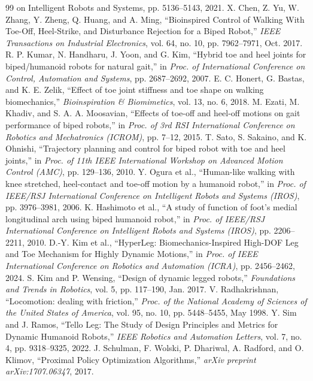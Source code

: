 \documentclass[10pt,twocolumn]{ICCAS}
\begin{document}
\begin{thebibliography}{99}
{on Intelligent Robots and Systems}, pp. 5136--5143, 2021.
X. Chen, Z. Yu, W. Zhang, Y. Zheng, Q. Huang, and A. Ming, ``Bioinspired Control of Walking With Toe-Off, Heel-Strike, and Disturbance Rejection for a Biped Robot,'' \textit{IEEE Transactions on
Industrial Electronics}, vol. 64, no. 10, pp. 7962--7971, Oct. 2017.
R. P. Kumar, N. Handharu, J. Yoon, and G. Kim, ``Hybrid toe and heel joints for biped/humanoid robots for natural gait,'' in \textit{Proc. of International Conference on Control, Automation and Systems},
pp. 2687--2692, 2007.
E. C. Honert, G. Bastas, and K. E. Zelik, ``Effect of toe joint stiffness and toe shape on walking biomechanics,'' \textit{Bioinspiration \& Biomimetics}, vol. 13, no. 6, 2018.
M. Ezati, M. Khadiv, and S. A. A. Moosavian, ``Effects of toe-off and heel-off motions on gait performance of biped robots,'' in \textit{Proc. of 3rd RSI International Conference on Robotics and
Mechatronics (ICROM)}, pp. 7--12, 2015.
T. Sato, S. Sakaino, and K. Ohnishi, ``Trajectory planning and control for biped robot with toe and heel joints,'' in \textit{Proc. of 11th IEEE International Workshop on Advanced Motion Control (AMC)},
pp. 129--136, 2010.
Y. Ogura et al., ``Human-like walking with knee stretched, heel-contact and toe-off motion by a humanoid robot,'' in \textit{Proc. of IEEE/RSJ International Conference on Intelligent Robots and Systems
(IROS)}, pp. 3976--3981, 2006.
K. Hashimoto et al., ``A study of function of foot's medial longitudinal arch using biped humanoid robot,'' in \textit{Proc. of IEEE/RSJ International Conference on Intelligent Robots and Systems (IROS)},
pp. 2206--2211, 2010.
D.-Y. Kim et al., ``HyperLeg: Biomechanics-Inspired High-DOF Leg and Toe Mechanism for Highly Dynamic Motions,'' in \textit{Proc. of IEEE International Conference on Robotics and Automation (ICRA)},
pp. 2456--2462, 2024.
S. Kim and P. Wensing, ``Design of dynamic legged robots,'' \textit{Foundations and Trends in Robotics}, vol. 5, pp. 117--190, Jan. 2017.
V. Radhakrishnan, ``Locomotion: dealing with friction,'' \textit{Proc. of the National Academy of Sciences of the United States of America}, vol. 95, no. 10, pp. 5448--5455, May 1998.
Y. Sim and J. Ramos, ``Tello Leg: The Study of Design Principles and Metrics for Dynamic Humanoid Robots,'' \textit{IEEE Robotics and Automation Letters}, vol. 7, no. 4, pp. 9318--9325, 2022.
J. Schulman, F. Wolski, P. Dhariwal, A. Radford, and O. Klimov, ``Proximal Policy Optimization Algorithms,'' \textit{arXiv preprint arXiv:1707.06347}, 2017.

\end{thebibliography}
\end{document}
